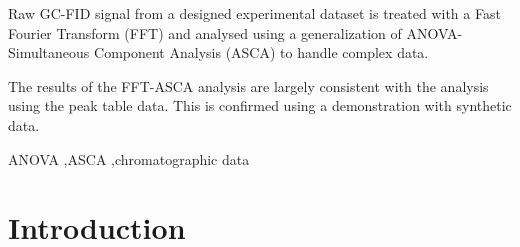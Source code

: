 \documentclass[preprint,12pt]{elsarticle}
\begin{document}
\begin{frontmatter}
\begin{abstract}
\end{abstract}



\begin{highlights}
\item Raw GC-FID signal from a designed experimental dataset is treated with a Fast Fourier Transform (FFT) and analysed using a generalization of ANOVA-Simultaneous Component Analysis (ASCA) to handle complex data.
\item The results of the FFT-ASCA analysis are largely consistent with the analysis using the peak table data. This is confirmed using a demonstration with synthetic data.
\end{highlights}

\begin{keyword}
ANOVA \sep ASCA \sep chromatographic data

\end{keyword}

\end{frontmatter}


\section{Introduction}
\label{sec:sample1}
\end{document}
